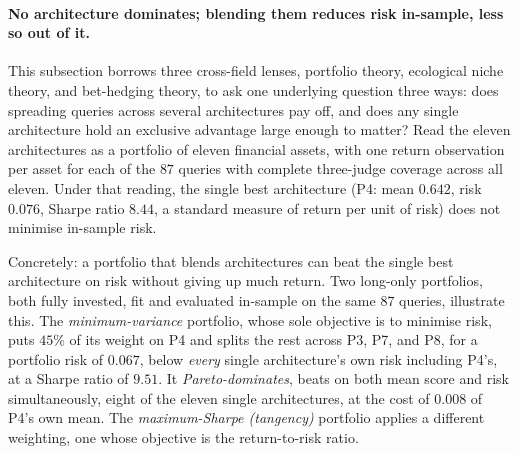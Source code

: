 \documentclass[11pt]{article}
\begin{document}
\paragraph{No architecture dominates; blending them reduces risk in-sample, less so out of it.}
This subsection borrows three cross-field lenses, portfolio theory, ecological niche
theory, and bet-hedging theory, to ask one underlying question three ways: does
spreading queries across several architectures pay off, and does any single architecture
hold an exclusive advantage large enough to matter? Read the eleven architectures as a
portfolio of eleven financial assets, with one return observation per asset for each of
the $87$ queries with complete three-judge coverage across all eleven. Under that
reading, the single best architecture (P4: mean $0.642$, risk $0.076$, Sharpe ratio
$8.44$, a standard measure of return per unit of risk) does not minimise in-sample risk.

Concretely: a portfolio that blends architectures can beat the single best architecture on
risk without giving up much return. Two long-only portfolios, both fully invested, fit and
evaluated in-sample on the same
$87$ queries, illustrate this. The \emph{minimum-variance} portfolio, whose sole
objective is to minimise risk, puts $45\%$ of its weight on P4
and splits the rest across P3, P7, and P8, for a portfolio risk of $0.067$, below
\emph{every} single architecture's own risk including P4's, at a Sharpe ratio of $9.51$.
It \emph{Pareto-dominates}, beats on both mean score and risk simultaneously, eight of
the eleven single architectures, at the cost of $0.008$ of P4's own mean. The
\emph{maximum-Sharpe (tangency)} portfolio applies a different weighting, one whose
objective is the return-to-risk ratio.
\end{document}
